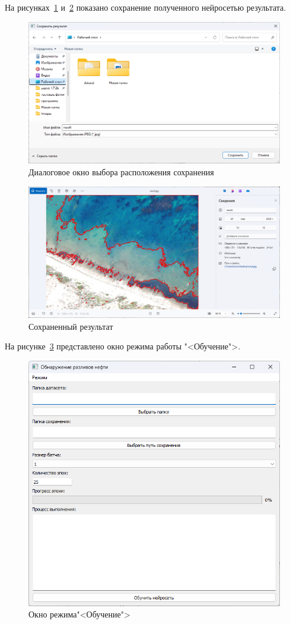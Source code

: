 На рисунках~\ref{fig:save_result} и~\ref{fig:saved_result} показано сохранение полученного нейросетью результата.
\begin{figure}[H]
	\centering
	\includegraphics[width=0.7\linewidth]{"images/диалог сохранения"}
	\caption{Диалоговое окно выбора расположения сохранения}
	\label{fig:save_result}
\end{figure}
\begin{figure}[H]
	\centering
	\includegraphics[width=0.7\linewidth]{"images/сохраненное пятно"}
	\caption{Сохраненный результат}
	\label{fig:saved_result}
\end{figure}

На рисунке~\ref{fig:train_ui} представлено окно режима работы "<Обучение">.
\begin{figure}[H]
	\centering
	\includegraphics[width=0.7\linewidth]{"images/обучение главное окно"}
	\caption{Окно режима"<Обучение">}
	\label{fig:train_ui}
\end{figure}

